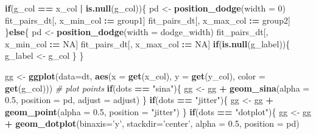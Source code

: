 \documentclass[]{book}
\newenvironment{Shaded}{\begin{snugshade}}{\end{snugshade}}
\newcommand{\CommentTok}[1]{\textcolor[rgb]{0.56,0.35,0.01}{\textit{#1}}}
\newcommand{\ControlFlowTok}[1]{\textcolor[rgb]{0.13,0.29,0.53}{\textbf{#1}}}
\newcommand{\DataTypeTok}[1]{\textcolor[rgb]{0.13,0.29,0.53}{#1}}
\newcommand{\DecValTok}[1]{\textcolor[rgb]{0.00,0.00,0.81}{#1}}
\newcommand{\ErrorTok}[1]{\textcolor[rgb]{0.64,0.00,0.00}{\textbf{#1}}}
\newcommand{\FloatTok}[1]{\textcolor[rgb]{0.00,0.00,0.81}{#1}}
\newcommand{\KeywordTok}[1]{\textcolor[rgb]{0.13,0.29,0.53}{\textbf{#1}}}
\newcommand{\NormalTok}[1]{#1}
\newcommand{\OperatorTok}[1]{\textcolor[rgb]{0.81,0.36,0.00}{\textbf{#1}}}
\newcommand{\OtherTok}[1]{\textcolor[rgb]{0.56,0.35,0.01}{#1}}
\newcommand{\StringTok}[1]{\textcolor[rgb]{0.31,0.60,0.02}{#1}}
\begin{document}
\begin{Shaded}
\begin{Highlighting}[]
  \ControlFlowTok{if}\NormalTok{(g_col }\OperatorTok{==}\StringTok{ }\NormalTok{x_col }\OperatorTok{|}\StringTok{ }\KeywordTok{is.null}\NormalTok{(g_col))\{}
\NormalTok{    pd <-}\StringTok{ }\KeywordTok{position_dodge}\NormalTok{(}\DataTypeTok{width =} \DecValTok{0}\NormalTok{)}
\NormalTok{    fit_pairs_dt[, x_min_col }\OperatorTok{:}\ErrorTok{=}\StringTok{ }\NormalTok{group1]}
\NormalTok{    fit_pairs_dt[, x_max_col }\OperatorTok{:}\ErrorTok{=}\StringTok{ }\NormalTok{group2]}
\NormalTok{  \}}\ControlFlowTok{else}\NormalTok{\{}
\NormalTok{    pd <-}\StringTok{ }\KeywordTok{position_dodge}\NormalTok{(}\DataTypeTok{width =}\NormalTok{ dodge_width)}
\NormalTok{    fit_pairs_dt[, x_min_col }\OperatorTok{:}\ErrorTok{=}\StringTok{ }\OtherTok{NA}\NormalTok{]}
\NormalTok{    fit_pairs_dt[, x_max_col }\OperatorTok{:}\ErrorTok{=}\StringTok{ }\OtherTok{NA}\NormalTok{]}
    \ControlFlowTok{if}\NormalTok{(}\KeywordTok{is.null}\NormalTok{(g_label))\{}
\NormalTok{      g_label <-}\StringTok{ }\NormalTok{g_col}
\NormalTok{    \}}
\NormalTok{  \}}


\NormalTok{  gg <-}\StringTok{ }\KeywordTok{ggplot}\NormalTok{(}\DataTypeTok{data=}\NormalTok{dt, }\KeywordTok{aes}\NormalTok{(}\DataTypeTok{x =} \KeywordTok{get}\NormalTok{(x_col),}
                            \DataTypeTok{y =} \KeywordTok{get}\NormalTok{(y_col),}
                            \DataTypeTok{color =} \KeywordTok{get}\NormalTok{(g_col)))}
  \CommentTok{# plot points}
  \ControlFlowTok{if}\NormalTok{(dots }\OperatorTok{==}\StringTok{ "sina"}\NormalTok{)\{}
\NormalTok{    gg <-}\StringTok{ }\NormalTok{gg }\OperatorTok{+}\StringTok{ }\KeywordTok{geom_sina}\NormalTok{(}\DataTypeTok{alpha =} \FloatTok{0.5}\NormalTok{,}
                         \DataTypeTok{position =}\NormalTok{ pd,}
                         \DataTypeTok{adjust =}\NormalTok{ adjust)}
\NormalTok{  \}}
  \ControlFlowTok{if}\NormalTok{(dots }\OperatorTok{==}\StringTok{ "jitter"}\NormalTok{)\{}
\NormalTok{    gg <-}\StringTok{ }\NormalTok{gg }\OperatorTok{+}\StringTok{ }\KeywordTok{geom_point}\NormalTok{(}\DataTypeTok{alpha =} \FloatTok{0.5}\NormalTok{,}
                         \DataTypeTok{position =} \StringTok{"jitter"}\NormalTok{)}
\NormalTok{  \}}
  \ControlFlowTok{if}\NormalTok{(dots }\OperatorTok{==}\StringTok{ "dotplot"}\NormalTok{)\{}
\NormalTok{    gg <-}\StringTok{ }\NormalTok{gg }\OperatorTok{+}\StringTok{ }\KeywordTok{geom_dotplot}\NormalTok{(}\DataTypeTok{binaxis=}\StringTok{'y'}\NormalTok{,}
                            \DataTypeTok{stackdir=}\StringTok{'center'}\NormalTok{,}
                            \DataTypeTok{alpha =} \FloatTok{0.5}\NormalTok{,}
                            \DataTypeTok{position =}\NormalTok{ pd)}


\end{Highlighting}
\end{Shaded}
\end{document}
